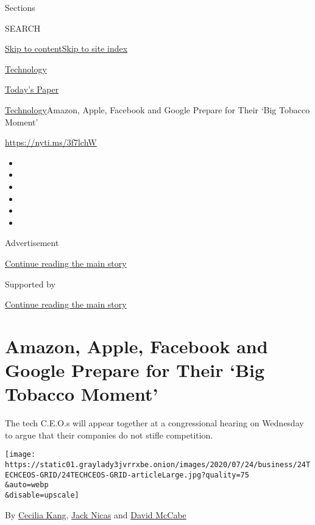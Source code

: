 Sections

SEARCH

\protect\hyperlink{site-content}{Skip to
content}\protect\hyperlink{site-index}{Skip to site index}

\href{https://www.nytimes3xbfgragh.onion/section/technology}{Technology}

\href{https://myaccount.nytimes3xbfgragh.onion/auth/login?response_type=cookie\&client_id=vi}{}

\href{https://www.nytimes3xbfgragh.onion/section/todayspaper}{Today's
Paper}

\href{/section/technology}{Technology}\textbar{}Amazon, Apple, Facebook
and Google Prepare for Their `Big Tobacco Moment'

\url{https://nyti.ms/3f7lchW}

\begin{itemize}
\item
\item
\item
\item
\item
\item
\end{itemize}

Advertisement

\protect\hyperlink{after-top}{Continue reading the main story}

Supported by

\protect\hyperlink{after-sponsor}{Continue reading the main story}

\hypertarget{amazon-apple-facebook-and-google-prepare-for-their-big-tobacco-moment}{%
\section{Amazon, Apple, Facebook and Google Prepare for Their `Big
Tobacco
Moment'}\label{amazon-apple-facebook-and-google-prepare-for-their-big-tobacco-moment}}

The tech C.E.O.s will appear together at a congressional hearing on
Wednesday to argue that their companies do not stifle competition.

\texttt{[image: https://static01.graylady3jvrrxbe.onion/images/2020/07/24/business/24TECHCEOS-GRID/24TECHCEOS-GRID-articleLarge.jpg?quality=75\\\&auto=webp\\\&disable=upscale]}

By \href{https://www.nytimes3xbfgragh.onion/by/cecilia-kang}{Cecilia
Kang}, \href{https://www.nytimes3xbfgragh.onion/by/jack-nicas}{Jack
Nicas} and
\href{https://www.nytimes3xbfgragh.onion/by/david-mccabe}{David McCabe}

